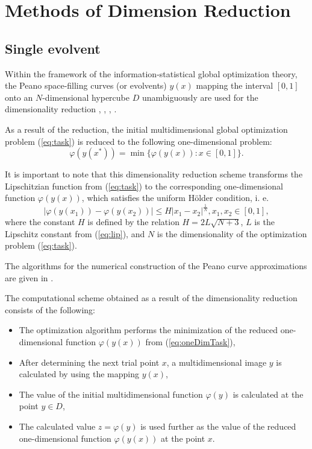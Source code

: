 \documentclass[procedia]{easychair}
\begin{document}
\section{Methods of Dimension Reduction}
\subsection{Single evolvent}

Within the framework of the information-statistical global optimization theory,
the Peano space-filling curves (or evolvents) \(y(x)\) mapping the interval \([0,1]\)
onto an \(N\)-dimensional hypercube \(D\) unambiguously are used for the dimensionality
reduction \cite{sergeyevStronginLera2013}, \cite{strongin1978},
\cite{stronginGergelBarkalovParGO}, \cite{strSergGO}.
\par
As a result of the reduction, the initial multidimensional global optimization
problem (\ref{eq:task}) is reduced to the following one-dimensional problem:
\begin{equation}
\label{eq:oneDimTask}
\varphi(y(x^*))=\min\{\varphi(y(x)):x\in [0,1]\}.
\end{equation}
\par
It is important to note that this dimensionality reduction scheme transforms the %
Lipschitzian function from (\ref{eq:task}) to the corresponding one-dimensional
function \(\varphi(y(x))\), which satisfies the uniform H{\"o}lder condition, i. e.
\begin{equation}
\label{eq:holder}
|\varphi(y(x_1))-\varphi(y(x_2))|\leq H{|x_1-x_2|}^{\frac{1}{N}}, x_1,x_2\in[0,1],
\end{equation}
where the constant $H$ is defined by the relation \(H=2L\sqrt{N+3}\), \(L\) is the Lipschitz
constant from (\ref{eq:lip}), and \(N\) is the dimensionality of the optimization problem
(\ref{eq:task}).
\par
The algorithms for the numerical construction of the Peano curve approximations are
given in \cite{strSergGO}.

\par
The computational scheme obtained as a result of the dimensionality reduction consists of the
following:
\begin{itemize}
  \item The optimization algorithm performs the minimization of the reduced one-dimensional
  function \(\varphi(y(x))\) from (\ref{eq:oneDimTask}),
  \item After determining the next trial point \(x\), a multidimensional image \(y\) is calculated by
using the mapping \(y(x)\),
  \item The value of the initial multidimensional function \(\varphi(y)\) is calculated at the point
\(y\in D\),
  \item The calculated value \(z=\varphi(y)\) is used further as the value of the reduced one-dimensional function \(\varphi(y(x))\) at the point \(x\).
\end{itemize}
\end{document}
